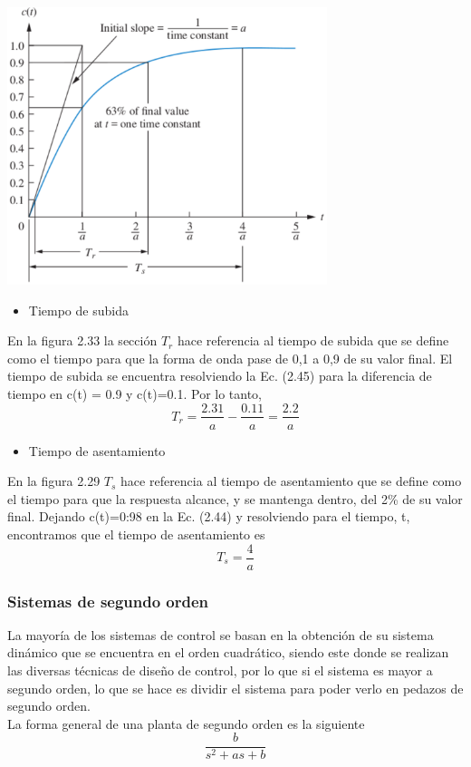 \begin{center}
	\includegraphics[width=0.7\textwidth]{Contenido/Cuerpo/Capitulo2/Fig27.eps}
	\label{fig:MarcoTeorico:Fig25}
\end{center}
\begin{itemize}
	\item Tiempo de subida
\end{itemize}
En la figura 2.33 la sección $T_r$ hace referencia al tiempo de subida que se define como el tiempo para que la forma de onda pase de 0,1 a 0,9 de su valor final. El tiempo de subida se encuentra 
resolviendo la Ec. (2.45) para la diferencia de tiempo en c(t) = 0.9 y c(t)=0.1. Por lo tanto,
\begin{equation}
	T_r = \frac{2.31}{a} - \frac{0.11}{a} = \frac{2.2}{a}
\end{equation}
\begin{itemize}
	\item Tiempo de asentamiento
\end{itemize}
En la figura 2.29 $T_s$ hace referencia al tiempo de asentamiento que se define como el tiempo para que la respuesta alcance, y se mantenga dentro, del 2\% de su valor final. 
Dejando c(t)=0:98 en la Ec. (2.44) y resolviendo para el tiempo, t, encontramos que el tiempo de asentamiento es
\begin{equation}
	T_s = \frac{4}{a}
\end{equation}

\subsubsection{Sistemas de segundo orden}
La mayoría de los sistemas de control se basan en la obtención de su sistema dinámico que se encuentra en el orden cuadrático, siendo este
donde se realizan las diversas técnicas de diseño de control, por lo que si el sistema es mayor a segundo orden, lo que se hace es dividir
el sistema para poder verlo en pedazos de segundo orden.\\
La forma general de una planta de segundo orden es la siguiente
\begin{equation}
	\frac{b}{s^2+as+b}
\end{equation}
